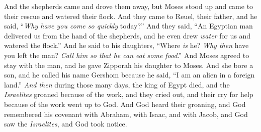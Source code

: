 \begin{biblechapter}
\verse And the shepherds came and drove them away, but Moses stood up and came to their rescue and watered their flock.
\verse And they came to Reuel, their father, and he said, “\textit{Why have you come so quickly} today?”
\verse And they said, “An Egyptian man delivered us from the hand of the shepherds, and he even drew \textit{water} for us and watered the flock.”
\verse And he said to his daughters, “Where \textit{is} he? \textit{Why then} have you left the man? \textit{Call him so that he can eat some food}.”
\verse And Moses agreed to stay with the man, and he gave Zipporah his daughter to Moses.
\verse And she bore a son, and he called his name Gershom because he said, “I am an alien in a foreign land.”
\verse \textit{And then} during those many days, the king of Egypt died, and the \textit{Israelites} groaned because of the work, and they cried out, and their cry for help because of the work went up to God.
\verse And God heard their groaning, and God remembered his covenant with Abraham, with Isaac, and with Jacob,
\verse and God saw the \textit{Israelites}, and God took notice.
\end{biblechapter}

